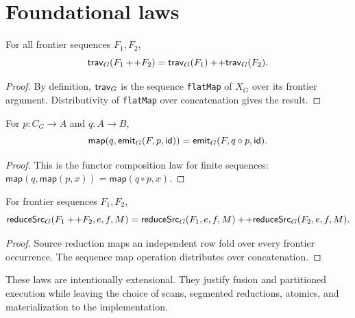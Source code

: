 \section{Foundational laws}

\begin{theorem}\label{thm:frontier-homomorphism}
For all frontier sequences $F_1,F_2$,
\[
  \mathsf{trav}_G(F_1+\!+F_2)=\mathsf{trav}_G(F_1)+\!+\mathsf{trav}_G(F_2).
\]
\end{theorem}

\begin{proof}
By definition, $\mathsf{trav}_G$ is the sequence \texttt{flatMap} of $X_G$ over its
frontier argument.  Distributivity of \texttt{flatMap} over concatenation gives
the result.
\end{proof}

\begin{theorem}\label{thm:emission-fusion}
For $p:C_G\to A$ and $q:A\to B$,
\[
  \mathsf{map}(q,\mathsf{emit}_G(F,p,\mathsf{id}))
  =\mathsf{emit}_G(F,q\circ p,\mathsf{id}).
\]
\end{theorem}

\begin{proof}
This is the functor composition law for finite sequences:
$\mathsf{map}(q,\mathsf{map}(p,x))=\mathsf{map}(q\circ p,x)$.
\end{proof}

\begin{theorem}
For frontier sequences $F_1,F_2$,
\[
  \mathsf{reduceSrc}_G(F_1+\!+F_2,e,f,M)
  =\mathsf{reduceSrc}_G(F_1,e,f,M)+\!+\mathsf{reduceSrc}_G(F_2,e,f,M).
\]
\end{theorem}

\begin{proof}
Source reduction maps an independent row fold over every frontier occurrence.
The sequence map operation distributes over concatenation.
\end{proof}

These laws are intentionally extensional.  They justify fusion and partitioned
execution while leaving the choice of scans, segmented reductions, atomics, and
materialization to the implementation.
